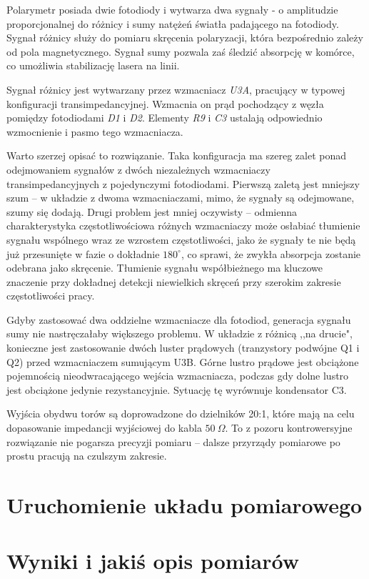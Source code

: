\documentclass[a4paper,10pt]{article}
\begin{document}
Polarymetr posiada dwie fotodiody i wytwarza dwa sygnały - o amplitudzie proporcjonalnej do różnicy i sumy natężeń światła padającego na fotodiody.
Sygnał różnicy służy do pomiaru skręcenia polaryzacji, która bezpośrednio zależy od pola magnetycznego.  Sygnał sumy pozwala zaś śledzić absorpcję w komórce, co umożliwia stabilizację lasera na linii.

Sygnał różnicy jest wytwarzany przez wzmacniacz \textit{U3A}, pracujący w typowej konfiguracji transimpedancyjnej. Wzmacnia on prąd pochodzący z węzła pomiędzy fotodiodami \textit{D1} i \textit{D2}.
Elementy \textit{R9} i \textit{C3} ustalają odpowiednio wzmocnienie i pasmo tego wzmacniacza.

Warto szerzej opisać to rozwiązanie. Taka konfiguracja ma szereg zalet ponad odejmowaniem sygnałów z dwóch niezależnych wzmacniaczy transimpedancyjnych z pojedynczymi fotodiodami.
Pierwszą zaletą jest mniejszy szum -- w układzie z dwoma wzmacniaczami, mimo, że sygnały są odejmowane, szumy się dodają. Drugi problem jest mniej oczywisty -- odmienna charakterystyka częstotliwościowa różnych wzmacniaczy może osłabiać tłumienie sygnału wspólnego wraz ze wzrostem częstotliwości, jako że sygnały te nie będą już przesunięte w fazie o dokładnie $180^{\circ}$, co sprawi, że zwykła absorpcja zostanie odebrana jako skręcenie. Tłumienie sygnału współbieżnego ma kluczowe znaczenie przy dokładnej detekcji niewielkich skręceń przy szerokim zakresie częstotliwości pracy.

Gdyby zastosować dwa oddzielne wzmacniacze dla fotodiod, generacja sygnału sumy nie nastręczałaby większego problemu. W układzie z różnicą ,,na drucie", konieczne jest zastosowanie dwóch luster prądowych (tranzystory podwójne Q1 i Q2) przed wzmacniaczem sumującym U3B. Górne lustro prądowe jest obciążone pojemnością nieodwracającego wejścia wzmacniacza, podczas gdy dolne lustro jest obciążone jedynie rezystancyjnie. Sytuację tę wyrównuje kondensator C3. 

Wyjścia obydwu torów są doprowadzone do dzielników 20:1, które mają na celu dopasowanie impedancji wyjściowej do kabla $50~\Omega$. To z pozoru kontrowersyjne rozwiązanie nie pogarsza precyzji pomiaru -- dalsze przyrządy pomiarowe po prostu pracują na czulszym zakresie.

\section{Uruchomienie układu pomiarowego}


\section{Wyniki i jakiś opis pomiarów}
\end{document}
